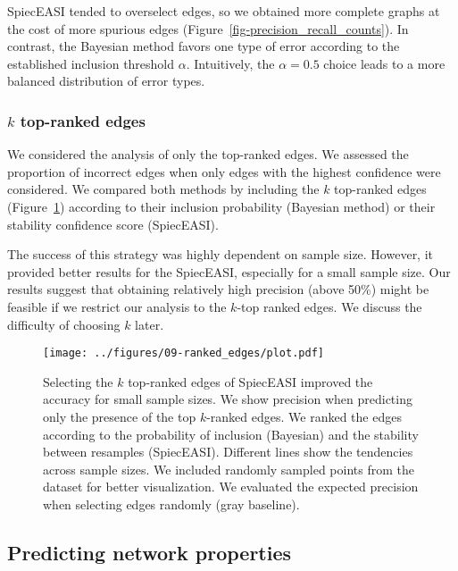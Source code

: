 \documentclass[
  a4paper,
]{article}
\begin{document}
SpiecEASI tended to overselect edges, so we obtained more complete
graphs at the cost of more spurious edges
(Figure~\ref{fig-precision_recall_counts}). In contrast, the Bayesian
method favors one type of error according to the established inclusion
threshold \(\alpha\). Intuitively, the \(\alpha = 0.5\) choice leads to
a more balanced distribution of error types.

\hypertarget{k-top-ranked-edges}{%
\subsubsection{\texorpdfstring{\(k\) top-ranked
edges}{k top-ranked edges}}\label{k-top-ranked-edges}}

We considered the analysis of only the top-ranked edges. We assessed the
proportion of incorrect edges when only edges with the highest
confidence were considered. We compared both methods by including the
\(k\) top-ranked edges (Figure~\ref{fig-ranked}) according to their
inclusion probability (Bayesian method) or their stability confidence
score (SpiecEASI).

The success of this strategy was highly dependent on sample size.
However, it provided better results for the SpiecEASI, especially for a
small sample size. Our results suggest that obtaining relatively high
precision (above 50\%) might be feasible if we restrict our analysis to
the \(k\)-top ranked edges. We discuss the difficulty of choosing \(k\)
later.

\begin{figure}

{\centering \texttt{[image: ../figures/09-ranked\_edges/plot.pdf]}

}

\caption{\label{fig-ranked}Selecting the \(k\) top-ranked edges of
SpiecEASI improved the accuracy for small sample sizes. We show
precision when predicting only the presence of the top \(k\)-ranked
edges. We ranked the edges according to the probability of inclusion
(Bayesian) and the stability between resamples (SpiecEASI). Different
lines show the tendencies across sample sizes. We included randomly
sampled points from the dataset for better visualization. We evaluated
the expected precision when selecting edges randomly (gray baseline).}

\end{figure}

\hypertarget{predicting-network-properties}{%
\subsection{Predicting network
properties}\label{predicting-network-properties}}
\end{document}
